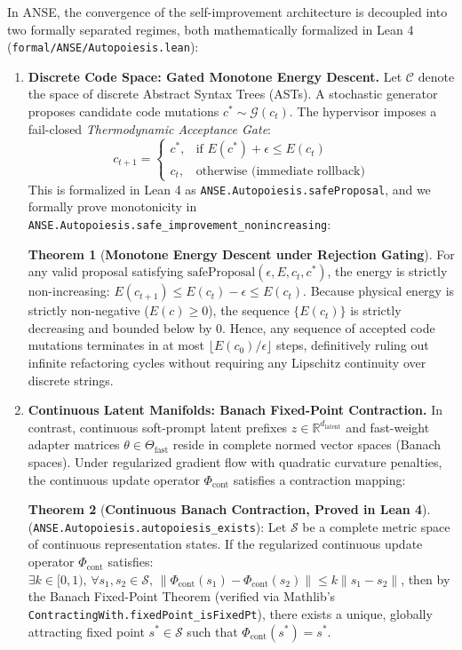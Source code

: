 \documentclass[10pt,journal,compsoc]{IEEEtran}
\theoremstyle{definition}
\newtheorem{theorem}{Theorem}
\begin{document}
In ANSE, the convergence of the self-improvement architecture is decoupled into two formally separated regimes, both mathematically formalized in Lean 4 (\texttt{formal/ANSE/Autopoiesis.lean}):
\begin{enumerate}
    \item \textbf{Discrete Code Space: Gated Monotone Energy Descent.}
    Let $\mathcal{C}$ denote the space of discrete Abstract Syntax Trees (ASTs). A stochastic generator proposes candidate code mutations $c^* \sim \mathcal{G}(c_t)$. The hypervisor imposes a fail-closed \textit{Thermodynamic Acceptance Gate}:
    \begin{equation}
    c_{t+1} = \begin{cases} c^*, & \text{if } E(c^*) + \epsilon \le E(c_t) \\ c_t, & \text{otherwise (immediate rollback)} \end{cases}
    \end{equation}
    This is formalized in Lean 4 as \texttt{ANSE.Autopoiesis.safeProposal}, and we formally prove monotonicity in \texttt{ANSE.Autopoiesis.safe\_improvement\_nonincreasing}:
    \begin{theorem}[\textbf{Monotone Energy Descent under Rejection Gating}]
    For any valid proposal satisfying $\text{safeProposal}(\epsilon, E, c_t, c^*)$, the energy is strictly non-increasing:
    $E(c_{t+1}) \le E(c_t) - \epsilon \le E(c_t)$.
    Because physical energy is strictly non-negative ($E(c) \ge 0$), the sequence $\{E(c_t)\}$ is strictly decreasing and bounded below by $0$. Hence, any sequence of accepted code mutations terminates in at most $\lfloor E(c_0) / \epsilon \rfloor$ steps, definitively ruling out infinite refactoring cycles without requiring any Lipschitz continuity over discrete strings.
    \end{theorem}

    \item \textbf{Continuous Latent Manifolds: Banach Fixed-Point Contraction.}
    In contrast, continuous soft-prompt latent prefixes $z \in \mathbb{R}^{d_{\text{latent}}}$ and fast-weight adapter matrices $\theta \in \Theta_{\text{fast}}$ reside in complete normed vector spaces (Banach spaces). Under regularized gradient flow with quadratic curvature penalties, the continuous update operator $\Phi_{\text{cont}}$ satisfies a contraction mapping:
    \begin{theorem}[\textbf{Continuous Banach Contraction, Proved in Lean 4}]
    (\texttt{ANSE.Autopoiesis.autopoiesis\_exists}): Let $\mathcal{S}$ be a complete metric space of continuous representation states. If the regularized continuous update operator $\Phi_{\text{cont}}$ satisfies:
    $\exists k \in [0, 1), \, \forall s_1, s_2 \in \mathcal{S}, \, \|\Phi_{\text{cont}}(s_1) - \Phi_{\text{cont}}(s_2)\| \le k \|s_1 - s_2\|$,
    then by the Banach Fixed-Point Theorem (verified via Mathlib's \texttt{ContractingWith.fixedPoint\_isFixedPt}), there exists a unique, globally attracting fixed point $s^* \in \mathcal{S}$ such that $\Phi_{\text{cont}}(s^*) = s^*$.
    \end{theorem}
\end{enumerate}
\end{document}
